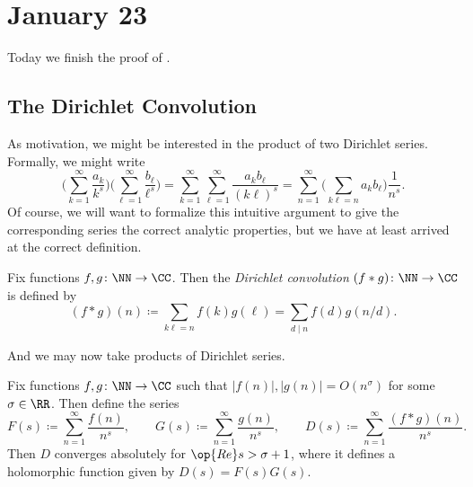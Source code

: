 \documentclass[../notes.tex]{subfiles}
\begin{document}
\section{January 23}

Today we finish the proof of .

\subsection{The Dirichlet Convolution}
As motivation, we might be interested in the product of two Dirichlet series. Formally, we might write
\[\Bigg(\sum_{k=1}^\infty\frac{a_k}{k^s}\Bigg)\Bigg(\sum_{\ell=1}^\infty\frac{b_\ell}{\ell^s}\Bigg)=\sum_{k=1}^\infty\sum_{\ell=1}^\infty\frac{a_kb_\ell}{(k\ell)^s}=\sum_{n=1}^\infty\Bigg(\sum_{k\ell=n}a_kb_\ell\Bigg)\frac1{n^s}.\]
Of course, we will want to formalize this intuitive argument to give the corresponding series the correct analytic properties, but we have at least arrived at the correct definition.
\begin{definition}
	Fix functions $f,g\colon\NN\to\CC$. Then the \textit{Dirichlet convolution} $(f*g)\colon\NN\to\CC$ is defined by
	\[(f*g)(n)\coloneqq\sum_{k\ell=n}f(k)g(\ell)=\sum_{d\mid n}f(d)g(n/d).\]
\end{definition}
And we may now take products of Dirichlet series.
\begin{proposition} \label{prop:prod-dir-series}
	Fix functions $f,g\colon\NN\to\CC$ such that $|f(n)|,|g(n)|=O\left(n^\sigma\right)$ for some $\sigma\in\RR$. Then define the series
	\[F(s)\coloneqq\sum_{n=1}^\infty\frac{f(n)}{n^s},\qquad G(s)\coloneqq\sum_{n=1}^\infty\frac{g(n)}{n^s},\qquad D(s)\coloneqq\sum_{n=1}^\infty\frac{(f*g)(n)}{n^s}.\]
	Then $D$ converges absolutely for $\op{Re}s>\sigma+1$, where it defines a holomorphic function given by $D(s)=F(s)G(s)$.
\end{proposition}
\end{document}
